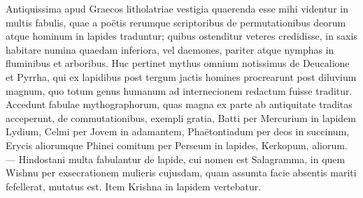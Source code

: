 \documentclass[a4paper, 11pt, oneside, polutonikogreek, german]{article}
\begin{document}
Antiquissima apud Graecos litholatriae vestigia quaerenda esse mihi videntur in multis fabulis, quae a poëtis rerumque scriptoribus de permutationibus deorum atque hominum in lapides traduntur; quibus ostenditur veteres credidisse, in saxis habitare numina quaedam inferiora, vel daemones, pariter atque nymphas in fluminibus et arboribus. Huc pertinet mythus omnium notissimus de Deucalione et Pyrrha, qui ex lapidibus post tergum jactis homines procrearunt post diluvium magnum, quo totum genus humanum ad internecionem redactum fuisse traditur. Accedunt fabulae mythographorum, quas magna ex parte ab antiquitate traditas acceperunt, de commutationibus, exempli gratia, Batti per Mercurium in lapidem Lydium, Celmi per Jovem in adamantem, Phaëtontiadum per deos in succinum, Erycis aliorumque Phinei comitum per Perseum in lapides, Kerkopum, aliorum. --- Hindostani multa fabulantur de lapide, cui nomen est Salagramma, in quem Wishnu per exsecrationem mulieris cujusdam, quam assumta facie absentis mariti fefellerat, mutatus est. Item Krishna in lapidem vertebatur.
\end{document}
